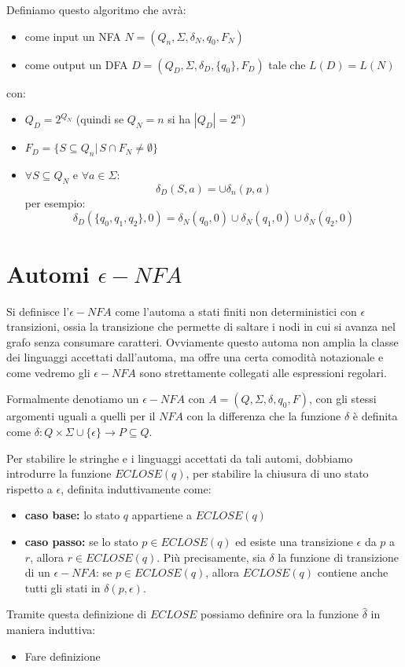 \documentclass[a4paper]{book}
\theoremstyle{definition}%
\begin{document}
Definiamo questo algoritmo che avrà:
\begin{itemize}
\item come input un NFA $N=(Q_n,\Sigma,\delta_N,q_0,F_N)$
\item come output un DFA $D=(Q_D,\Sigma,\delta_D,\{q_0\},F_D)$ tale che $L(D)=L(N)$
\end{itemize}
con:
\begin{itemize}
\item $Q_D=2^{Q_N}$ (quindi se $Q_N=n$ si ha $|Q_D|=2^n$)
\item $F_D=\{S\subseteq Q_n|\, S\cap F_N\neq \emptyset\}$
\item $\forall S\subseteq Q_N$ e $ \forall a \in\Sigma$:
$$\delta_D(S,a)=\cup \delta_n(p,a)$$
per esempio:
$$\delta_D(\{q_0,q_1,q_2\},0)=\delta_N(q_0,0)\cup \delta_N(q_1,0) \cup\delta_N(q_2,0) $$
\end{itemize}

\section{Automi $\epsilon-NFA$}
Si definisce l'$\epsilon-NFA$ come l'automa a stati finiti non deterministici con $\epsilon$ transizioni,
ossia la transizione che permette di saltare i nodi in cui si avanza nel grafo senza consumare caratteri.\newline
Ovviamente questo automa non amplia la classe dei linguaggi accettati dall'automa, ma offre
una certa comodità notazionale e come vedremo gli $\epsilon-NFA$ sono strettamente collegati alle espressioni regolari.

Formalmente denotiamo un $\epsilon-NFA$ con $A = (Q, \Sigma, \delta, q_0, F)$, con gli
stessi argomenti uguali a quelli per il $NFA$ con la differenza che la funzione $\delta$
è definita come $\delta:Q \times \Sigma \cup \{\epsilon\} \to P \subseteq Q$.

Per stabilire le stringhe e i linguaggi accettati da tali automi, dobbiamo introdurre
la funzione $ECLOSE(q)$, per stabilire la chiusura di uno stato rispetto a $\epsilon$, definita induttivamente come:
\begin{itemize}
  \item \textbf{caso base:} lo stato $q$ appartiene a $ECLOSE(q)$
  \item \textbf{caso passo:} se lo stato $p \in ECLOSE(q)$ ed esiste una transizione $\epsilon$ da $p$ a $r$, allora $r \in ECLOSE(q)$.\newline
        Più precisamente, sia $\delta$ la funzione di transizione di un $\epsilon-NFA$: se $p \in ECLOSE(q)$,
        allora $ECLOSE(q)$ contiene anche tutti gli stati in $\delta(p, \epsilon)$.
\end{itemize}
Tramite questa definizione di $ECLOSE$ possiamo definire ora la funzione $\hat{\delta}$ in maniera induttiva:
\begin{itemize}
\item Fare definizione
\end{itemize}
\end{document}
